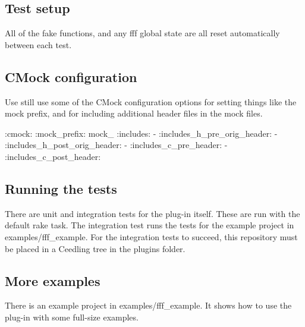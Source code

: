 \subsection*{Test setup}

All of the fake functions, and any fff global state are all reset automatically between each test.

\subsection*{C\+Mock configuration}

Use still use some of the C\+Mock configuration options for setting things like the mock prefix, and for including additional header files in the mock files.


\begin{DoxyCode}
:cmock:
    :mock\_prefix: mock\_
        :includes:
            -
        :includes\_h\_pre\_orig\_header:
            -
        :includes\_h\_post\_orig\_header:
            -
        :includes\_c\_pre\_header:
            -
        :includes\_c\_post\_header:
\end{DoxyCode}


\subsection*{Running the tests}

There are unit and integration tests for the plug-\/in itself. These are run with the default {\ttfamily rake} task. The integration test runs the tests for the example project in examples/fff\+\_\+example. For the integration tests to succeed, this repository must be placed in a Ceedling tree in the plugins folder.

\subsection*{More examples}

There is an example project in examples/fff\+\_\+example. It shows how to use the plug-\/in with some full-\/size examples. 